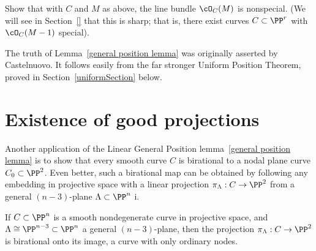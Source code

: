\begin{exercise}
Show that with $C$ and $M$ as above, the line bundle $\cO_C(M)$ is nonspecial. (We will see in Section~\ref{} that this is sharp; that is, there exist curves $C \subset \PP^r$ with $\cO_C(M-1)$ special).
\end{exercise}

The truth of Lemma~\ref{general position lemma} was originally asserted by Castelnuovo. It follows easily from the far stronger Uniform Position Theorem, proved in Section~\ref{uniformSection} below.


\section{Existence of good projections}\label{projection section}\label{good projections}


Another application of the Linear General Position lemma~\ref{general position lemma} is to show that every smooth curve $C$ is birational to a nodal plane curve $C_0 \subset \PP^2$. Even better, such a birational map can be obtained by following any embedding in projective space with a  linear projection $\pi_\Lambda : C \to \PP^2$ from a general $(n-3)$-plane $\Lambda \subset \PP^n$ i. 

\begin{proposition}\label{nodal projection}
If $C \subset \PP^n$ is a smooth nondegenerate curve in projective space, and $\Lambda \cong \PP^{n-3} \subset \PP^n$ a general $(n-3)$-plane, then the projection $\pi_\Lambda : C \to \PP^2$ is birational onto its image, a curve with only ordinary nodes.
\end{proposition}


